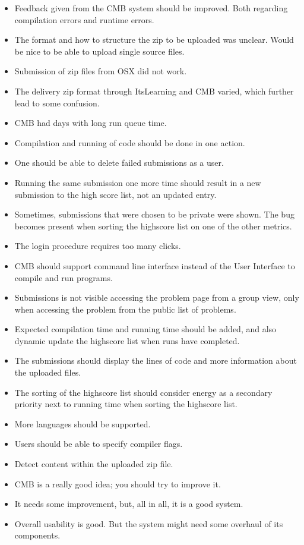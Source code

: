 \begin{itemize}
\item Feedback given from the CMB system should be improved. Both regarding compilation errors and runtime errors.
\item The format and how to structure the zip to be uploaded was unclear. Would be nice to be able to upload single source files.
\item Submission of zip files from OSX did not work.
\item The delivery zip format through ItsLearning and CMB varied, which further lead to some confusion.
\item CMB had days with long run queue time.
\item Compilation and running of code should be done in one action.
\item One should be able to delete failed submissions as a user.
\item Running the same submission one more time should result in a new submission to the high score list, not an updated entry.
\item Sometimes, submissions that were chosen to be private were shown. The bug becomes present when sorting the highscore list on one of the other metrics.
\item The login procedure requires too many clicks.
\item CMB should support command line interface instead of the User Interface to compile and run programs.
\item Submissions is not visible accessing the problem page from a group view, only when accessing the problem from the public list of problems.
\item Expected compilation time and running time should be added, and also dynamic update the highscore list when runs have completed.
\item The submissions should display the lines of code and more information about the uploaded files.
\item The sorting of the highscore list should consider energy as a secondary priority next to running time when sorting the highscore list.
\item More languages should be supported.
\item Users should be able to specify compiler flags.
\item Detect content within the uploaded zip file.
\item CMB is a really good idea; you should try to improve it.
\item It needs some improvement, but, all in all, it is a good system.
\item Overall usability is good. But the system might need some overhaul of its components.
\end{itemize}

